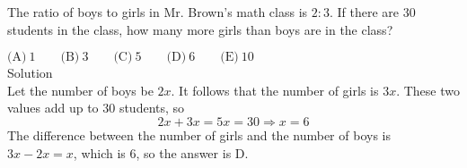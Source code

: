 

The ratio of boys to girls in Mr. Brown's math class is $2:3$. If there are $30$ students in the class, how many more girls than boys are in the class?

$\text{(A)}\ 1 \qquad \text{(B)}\ 3 \qquad \text{(C)}\ 5 \qquad \text{(D)}\ 6 \qquad \text{(E)}\ 10$
\\
Solution
\\
Let the number of boys be $2x$. It follows that the number of girls is $3x$. These two values add up to $30$ students, so \[2x+3x=5x=30\Rightarrow x=6\]
The difference between the number of girls and the number of boys is $3x-2x=x$, which is  $6$, so the answer is $\boxed{\text{D}}$.

